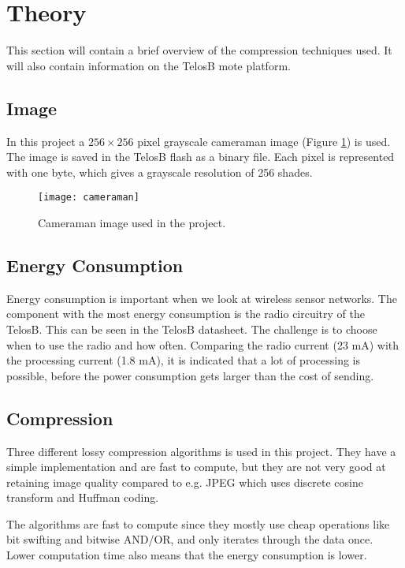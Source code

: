 \section{Theory}
This section will contain a brief overview of the compression techniques used. It will also contain information on the TelosB mote platform.


\subsection{Image}
In this project a $256 \times 256$ pixel grayscale cameraman image (Figure \ref{fig:image_cameraman}) is used. 
The image is saved in the TelosB flash as a binary file. Each pixel is represented with one byte, which gives a grayscale resolution of 256 shades.

\begin{figure}[ht!]
\centering
\texttt{[image: cameraman]}
\caption{Cameraman image used in the project.}
\label{fig:image_cameraman}
\end{figure}

\subsection{Energy Consumption}
Energy consumption is important when we look at wireless sensor networks. 
The component with the most energy consumption is the radio circuitry of the TelosB.
This can be seen in the TelosB datasheet\cite{dataSheet}. 
The challenge is to choose when to use the radio and how often. 
Comparing the radio current (23 mA) with the processing current (1.8 mA), it is indicated that a lot of processing is possible, before the power consumption gets larger than the cost of sending. 

\subsection{Compression}

Three different lossy compression algorithms is used in this project.
They have a simple implementation and are fast to compute, but they are not very good at retaining image quality compared to e.g. JPEG which uses discrete cosine transform and Huffman coding.

The algorithms are fast to compute since they mostly use cheap operations like bit swifting and bitwise AND/OR, and only iterates through the data once.
Lower computation time also means that the energy consumption is lower.


